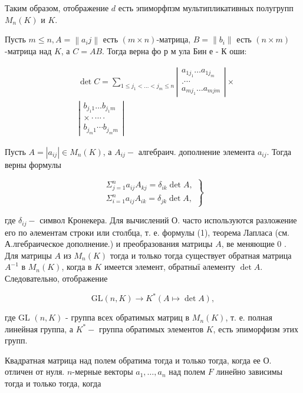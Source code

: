 \documentclass[10pt]{article}
\begin{document}
Таким образом, отображение $d$ есть эпиморфпзм мультипликативных полугрупп $M_{n}(K)$ и $K$.

Пусть $m \leqslant n, A=\left\|a_{i} j\right\|$ есть $(m \times n)$-матрица, $B=\left\|b_{i}\right\|$ есть $(n \times m)$-матрица над $K$, а $C=A B$. Тогда верна фо р м ула Бин е - К оши:

\[
\begin{aligned}
& \operatorname{det} C=\sum_{1 \leqslant j_{1}<\ldots<j_{m} \leqslant n}\left|\begin{array}{c}
a_{1 j_{1}} \ldots a_{1 j_{m}} \\
. \cdots \\
a_{m j_{1}} \ldots a_{m j m}
\end{array}\right| \times \\
& \left|\begin{array}{c}
b_{j_{1} 1} \ldots b_{j_{1} m} \\
\times \cdot \cdots \cdot \\
b_{j_{m} 1} \cdots b_{j_{m} m}
\end{array}\right|
\end{aligned}
\]

Пусть $A=\left|a_{i j}\right| \in M_{n}(K)$, а $A_{i j}-$ алгебраич. дополнение элемента $a_{i j}$. Тогда верны формулы

\[
\left.\begin{array}{c}
\Sigma_{j=1}^{n} a_{i j} A_{k j}=\delta_{i k} \operatorname{det} A, \\
\Sigma_{i=1}^{n} a_{i j} A_{i k}=\delta_{j k} \operatorname{det} A,
\end{array}\right\}
\]

где $\delta_{i j}-$ символ Кронекера. Для вычислений О. часто используются разложение его по әлементам строки или столбца, т. е. формулы (1), теорема Лапласа (см. А.лгебраическое дополнение.) и преобразования матрицы $A$, ве меняющие 0 . Для матрицы $A$ из $M_{n}(K)$ тогда и только тогда существует обратная матрица $A^{-1}$ в $M_{n}(K)$, когда в $K$ имеется элемент, обратныї әлементу $\operatorname{det} A$. Следовательно, отображение

\[
\mathrm{GL}(n, K) \longrightarrow K^{*}(A \mapsto \operatorname{det} A),
\]

где GL $(n, K)$ - группа всех обратимых матриц в $M_{n}(K)$, т. е. полная линейная группа, а $K^{*}-$ группа обратимых элементов $K$, есть эпиморфизм этих групп.

Квадратная матрица над полем обратима тогда и только тогда, когда ее О. отличен от нуля. $n$-мерные векторы $a_{1}, \ldots, a_{n}$ над полем $F$ линейно зависимы тогда и только тогда, когда
\end{document}
